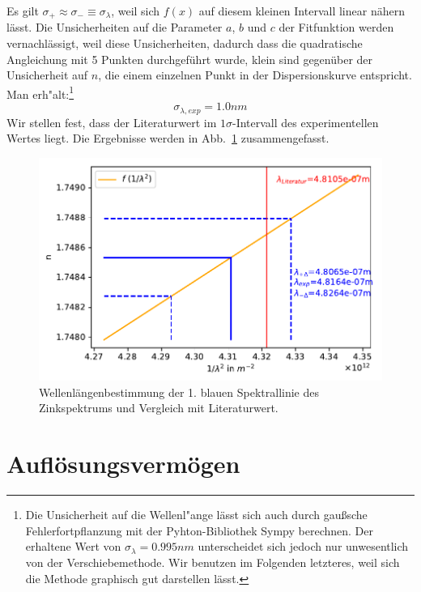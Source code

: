 \documentclass[12pt,a4paper]{article}
\begin{document}
Es gilt $\sigma_+\approx\sigma_-\equiv\sigma_{\lambda}$, weil sich $f(x)$ auf diesem kleinen Intervall linear nähern lässt. Die Unsicherheiten auf die Parameter $a$, $b$ und $c$ der Fitfunktion werden vernachlässigt, weil diese Unsicherheiten, dadurch dass die quadratische Angleichung mit 5 Punkten durchgeführt wurde, klein sind gegenüber der Unsicherheit auf $n$, die einem einzelnen Punkt in der Dispersionskurve entspricht. Man erh"alt:\footnote{Die Unsicherheit auf die Wellenl"ange lässt sich auch durch gaußsche Fehlerfortpflanzung mit der Pyhton-Bibliothek Sympy berechnen. Der erhaltene Wert von $\sigma_\lambda=0.995nm$ unterscheidet sich jedoch nur unwesentlich von der Verschiebemethode. Wir benutzen im Folgenden letzteres, weil sich die Methode graphisch gut darstellen lässt.}
\begin{equation}
\sigma_{\lambda,exp}=1.0nm
\end{equation}
Wir stellen fest, dass der Literaturwert im $1\sigma$-Intervall des experimentellen Wertes liegt. Die Ergebnisse werden in Abb.~\ref{Zn_0} zusammengefasst.
\begin{figure}[H]
	\centering
	\includegraphics[width=\linewidth]{Python/Zn_0.pdf}
	\caption{Wellenlängenbestimmung der 1. blauen Spektrallinie des Zinkspektrums und Vergleich mit Literaturwert.}
	\label{Zn_0}
\end{figure}

\section{Auflösungsvermögen}
\end{document}
